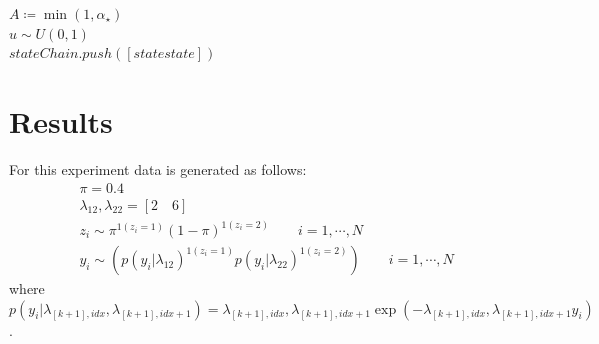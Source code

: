 \documentclass{article}
\begin{document}
\begin{algorithm}
{\begin{flalign*}
    \end{flalign*}    
    $A\coloneqq \min(1,\alpha_\star)$\\
    $u\sim U(0,1)$  \\
	 $stateChain.push([state state])$  
	}
    \caption{}
    \label{alg:post}
    \end{algorithm}

\clearpage
\section{Results}
For this experiment data is generated as follows:
\begin{align*}
& \pi =  0.4 \\
& \lambda_{12},\lambda_{22} =  [2\quad 6] \\
& z_i \sim \pi^{1(z_i=1)}(1-\pi)^{1(z_i=2)}\qquad i=1,\cdots,N\\
& y_i \sim (p(y_i|\lambda_{12})^{1(z_i=1)}p(y_i|\lambda_{22})^{1(z_i=2)})\qquad i=1,\cdots,N
\end{align*}
where $p(y_i|\lambda_{[k+1],idx},\lambda_{[k+1],idx+1})=\lambda_{[k+1],idx},\lambda_{[k+1],idx+1}\exp(-\lambda_{[k+1],idx},\lambda_{[k+1],idx+1}y_i)$.
\end{document}
